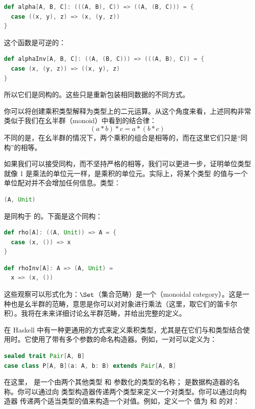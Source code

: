 \begin{lstlisting}[language=Scala]
def alpha[A, B, C]: (((A, B), C)) => ((A, (B, C))) = {
  case ((x, y), z) => (x, (y, z))
}
\end{lstlisting}
这个函数是可逆的：

\begin{lstlisting}[language=Scala]
def alphaInv[A, B, C]: ((A, (B, C))) => (((A, B), C)) = {
  case (x, (y, z)) => ((x, y), z)
}
\end{lstlisting}
所以它们是同构的。这些只是重新包装相同数据的不同方式。

你可以将创建乘积类型解释为类型上的二元运算。从这个角度来看，上述同构非常类似于我们在幺半群（monoid）中看到的结合律：
\[
  (a * b) * c = a * (b * c)
\]
不同的是，在幺半群的情况下，两个乘积的组合是相等的，而在这里它们只是“同构”的相等。

如果我们可以接受同构，而不坚持严格的相等，我们可以更进一步，证明单位类型 \code{()} 就像 1 是乘法的单位元一样，是乘积的单位元。实际上，将某个类型  的值与一个单位配对并不会增加任何信息。类型：

\begin{lstlisting}[language=Scala]
(A, Unit)
\end{lstlisting}
是同构于  的。下面是这个同构：

\begin{lstlisting}[language=Scala]
def rho[A]: ((A, Unit)) => A = {
  case (x, ()) => x
}
\end{lstlisting}

\begin{lstlisting}[language=Scala]
def rhoInv[A]: A => (A, Unit) =
  x => (x, ())
\end{lstlisting}
这些观察可以形式化为：$\Set$（集合范畴）是一个（monoidal category）。这是一种也是幺半群的范畴，意思是你可以对对象进行乘法（这里，取它们的笛卡尔积）。我将在未来详细讨论幺半群范畴，并给出完整的定义。

在 Haskell 中有一种更通用的方式来定义乘积类型，尤其是在它们与和类型结合使用时。它使用了带有多个参数的命名构造器。例如，一对可以定义为：

\begin{lstlisting}[language=Scala]
sealed trait Pair[A, B]
case class P[A, B](a: A, b: B) extends Pair[A, B]
\end{lstlisting}
在这里， 是一个由两个其他类型  和  参数化的类型的名称； 是数据构造器的名称。你可以通过向  类型构造器传递两个类型来定义一个对类型。你可以通过向构造器  传递两个适当类型的值来构造一个对值。例如，定义一个  值为  和  的对：

